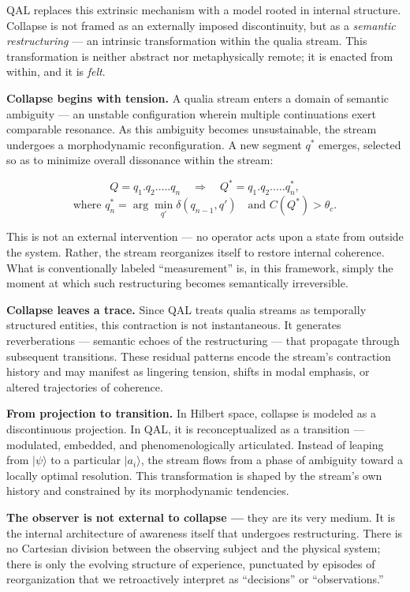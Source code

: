 \documentclass[11pt]{article}
\numberwithin{equation}{section} %
\begin{document}
QAL replaces this extrinsic mechanism with a model rooted in internal structure. Collapse is not framed as an externally imposed discontinuity, but as a \textit{semantic restructuring} — an intrinsic transformation within the qualia stream. This transformation is neither abstract nor metaphysically remote; it is enacted from within, and it is \textit{felt}.

\textbf{Collapse begins with tension.} A qualia stream enters a domain of semantic ambiguity — an unstable configuration wherein multiple continuations exert comparable resonance. As this ambiguity becomes unsustainable, the stream undergoes a morphodynamic reconfiguration. A new segment \( q^* \) emerges, selected so as to minimize overall dissonance within the stream:

\begin{equation}
Q = q_1 . q_2 . \dots . q_n \quad \Rightarrow \quad Q^* = q_1 . q_2 . \dots . q_n^*,
\end{equation}
\begin{equation}
\text{where } q_n^* = \arg\min_{q'} \delta(q_{n-1}, q') \quad \text{and } C(Q^*) > \theta_c.
\end{equation}

This is not an external intervention — no operator acts upon a state from outside the system. Rather, the stream reorganizes itself to restore internal coherence. What is conventionally labeled “measurement” is, in this framework, simply the moment at which such restructuring becomes semantically irreversible.

\textbf{Collapse leaves a trace.} Since QAL treats qualia streams as temporally structured entities, this contraction is not instantaneous. It generates reverberations — semantic echoes of the restructuring — that propagate through subsequent transitions. These residual patterns encode the stream’s contraction history and may manifest as lingering tension, shifts in modal emphasis, or altered trajectories of coherence.

\textbf{From projection to transition.} In Hilbert space, collapse is modeled as a discontinuous projection. In QAL, it is reconceptualized as a transition — modulated, embedded, and phenomenologically articulated. Instead of leaping from \( |\psi\rangle \) to a particular \( |a_i\rangle \), the stream flows from a phase of ambiguity toward a locally optimal resolution. This transformation is shaped by the stream’s own history and constrained by its morphodynamic tendencies.

\textbf{The observer is not external to collapse —} they are its very medium. It is the internal architecture of awareness itself that undergoes restructuring. There is no Cartesian division between the observing subject and the physical system; there is only the evolving structure of experience, punctuated by episodes of reorganization that we retroactively interpret as “decisions” or “observations.”
\end{document}
